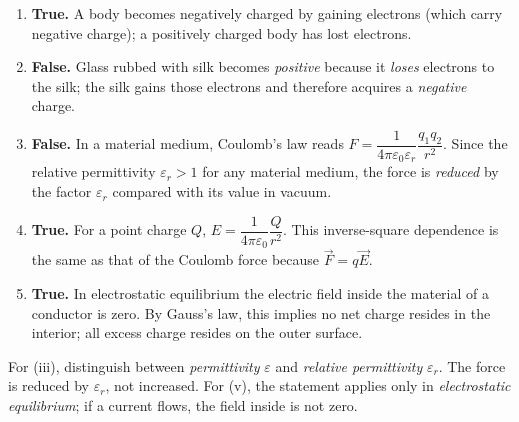 \documentclass[11pt]{article}
\begin{document}
\begin{corrige}
\begin{enumerate}
\item \textbf{True.} A body becomes negatively charged by gaining electrons (which carry negative charge); a positively charged body has lost electrons.
\item \textbf{False.} Glass rubbed with silk becomes \emph{positive} because it \emph{loses} electrons to the silk; the silk gains those electrons and therefore acquires a \emph{negative} charge.
\item \textbf{False.} In a material medium, Coulomb's law reads $F = \dfrac{1}{4\pi\varepsilon_{0}\varepsilon_{r}}\dfrac{q_{1}q_{2}}{r^{2}}$. Since the relative permittivity $\varepsilon_{r} > 1$ for any material medium, the force is \emph{reduced} by the factor $\varepsilon_{r}$ compared with its value in vacuum.
\item \textbf{True.} For a point charge $Q$, $E = \dfrac{1}{4\pi\varepsilon_{0}}\dfrac{Q}{r^{2}}$. This inverse-square dependence is the same as that of the Coulomb force because $\vec{F} = q\vec{E}$.
\item \textbf{True.} In electrostatic equilibrium the electric field inside the material of a conductor is zero. By Gauss's law, this implies no net charge resides in the interior; all excess charge resides on the outer surface.
\end{enumerate}
\end{corrige}

\begin{attention}
For (iii), distinguish between \emph{permittivity} $\varepsilon$ and \emph{relative permittivity} $\varepsilon_{r}$. The force is reduced by $\varepsilon_{r}$, not increased. For (v), the statement applies only in \emph{electrostatic equilibrium}; if a current flows, the field inside is not zero.
\end{attention}
\end{document}
